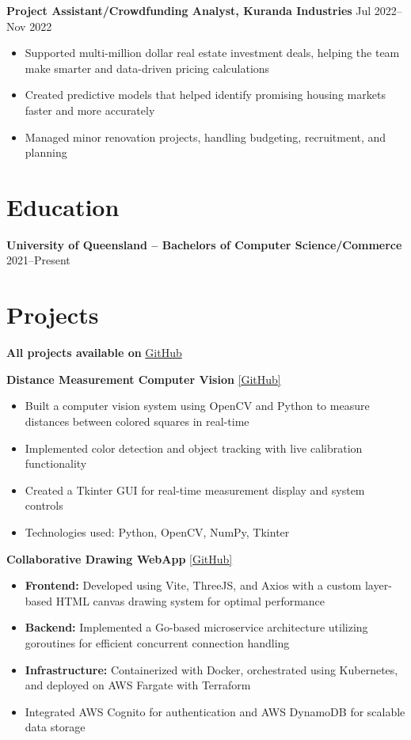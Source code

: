 \documentclass[10pt,a4paper]{article}
\begin{document}
	\textbf{Project Assistant/Crowdfunding Analyst, Kuranda Industries} \hfill Jul 2022--Nov 2022 
	\begin{itemize}[label=\textbullet, itemsep=0.05cm]
		\item Supported multi-million dollar real estate investment deals, helping the team make smarter and data-driven pricing calculations 
		\item Created predictive models that helped identify promising housing markets faster and more accurately
		\item Managed minor renovation projects, handling budgeting, recruitment, and planning
	\end{itemize}
	
	\section{Education}
	\textbf{University of Queensland -- Bachelors of Computer Science/Commerce} \hfill 2021--Present \\	
	\section{Projects}
	\textbf{All projects available on} \href{https://github.com/CameronBadman}{GitHub}
	
	\textbf{Distance Measurement Computer Vision} \href{https://github.com/CameronBadman/computer-vision}{[GitHub]}
	\begin{itemize}[label=\textbullet, itemsep=0.05cm]
		\item Built a computer vision system using OpenCV and Python to measure distances between colored squares in real-time
		\item Implemented color detection and object tracking with live calibration functionality
		\item Created a Tkinter GUI for real-time measurement display and system controls
		\item Technologies used: Python, OpenCV, NumPy, Tkinter
	\end{itemize}
	
	\textbf{Collaborative Drawing WebApp} \href{https://github.com/CameronBadman/Canvis-collab-webapp}{[GitHub]}
	\begin{itemize}[label=\textbullet, itemsep=0.05cm]
		\item \textbf{Frontend:} Developed using Vite, ThreeJS, and Axios with a custom layer-based HTML canvas drawing system for optimal performance
		\item \textbf{Backend:} Implemented a Go-based microservice architecture utilizing goroutines for efficient concurrent connection handling
		\item \textbf{Infrastructure:} Containerized with Docker, orchestrated using Kubernetes, and deployed on AWS Fargate with Terraform
		\item Integrated AWS Cognito for authentication and AWS DynamoDB for scalable data storage
	\end{itemize}
	
\end{document}
